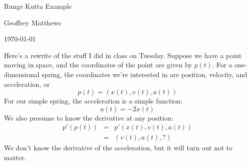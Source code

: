 \documentclass[twocolumn]{article}
\begin{document}
\centerline{\Large Runge Kutta Example}

\centerline{\large Geoffrey Matthews}

\centerline{\today}


Here's a rewrite of the stuff I did in class on Tuesday.
Suppose we have a point moving in space, and the coordinates of the
point are given by $p(t)$.  For a one-dimensional spring, the
coordinates we're interested in are position, velocity, and
acceleration, or 
\[
p(t) = (x(t), v(t), a(t))
\]
For our simple spring, the acceleration is a simple function:
\[
a(t) = -2x(t)
\]
We also presume to know the derivative at any position:
\begin{eqnarray*}
p'(p(t)) &=& p'(x(t), v(t), a(t))\\
         &=& (v(t), a(t), ?)
\end{eqnarray*}
We don't know the derivative of the acceleration, but it will turn out
not to matter.
\end{document}
